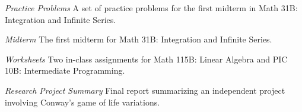 \documentclass[margin, 10pt]{res} %
\begin{document}
\textit{Practice Problems}
A set of practice problems for the first midterm in Math 31B: Integration and Infinite Series.

\textit{Midterm}
The first midterm for Math 31B: Integration and Infinite Series.

\textit{Worksheets}
Two in-class assignments for Math 115B: Linear Algebra and PIC 10B: Intermediate Programming.

\textit{Research Project Summary}
Final report summarizing an independent project involving Conway's game of life variations.










\end{document}
